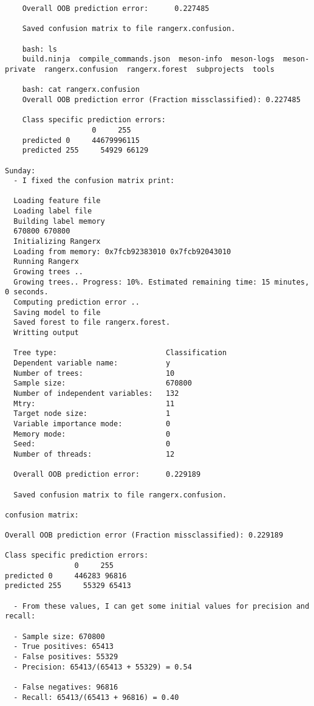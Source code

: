 \documentclass[12pt,oneside]{book}
\begin{document}
\begin{lstlisting}
    Overall OOB prediction error:      0.227485
    
    Saved confusion matrix to file rangerx.confusion.
    
    bash: ls
    build.ninja  compile_commands.json  meson-info  meson-logs  meson-private  rangerx.confusion  rangerx.forest  subprojects  tools
    
    bash: cat rangerx.confusion 
    Overall OOB prediction error (Fraction missclassified): 0.227485
    
    Class specific prediction errors:
                    0     255
    predicted 0     44679996115 
    predicted 255     54929 66129 

Sunday:
  - I fixed the confusion matrix print:

  Loading feature file
  Loading label file
  Building label memory
  670800 670800
  Initializing Rangerx
  Loading from memory: 0x7fcb92383010 0x7fcb92043010
  Running Rangerx
  Growing trees ..
  Growing trees.. Progress: 10%. Estimated remaining time: 15 minutes, 0 seconds.
  Computing prediction error ..
  Saving model to file
  Saved forest to file rangerx.forest.
  Writting output
  
  Tree type:                         Classification
  Dependent variable name:           y
  Number of trees:                   10
  Sample size:                       670800
  Number of independent variables:   132
  Mtry:                              11
  Target node size:                  1
  Variable importance mode:          0
  Memory mode:                       0
  Seed:                              0
  Number of threads:                 12
  
  Overall OOB prediction error:      0.229189
  
  Saved confusion matrix to file rangerx.confusion.

confusion matrix:

Overall OOB prediction error (Fraction missclassified): 0.229189

Class specific prediction errors:
                0     255
predicted 0     446283 96816 
predicted 255     55329 65413

  - From these values, I can get some initial values for precision and recall:

  - Sample size: 670800
  - True positives: 65413
  - False positives: 55329
  - Precision: 65413/(65413 + 55329) = 0.54

  - False negatives: 96816
  - Recall: 65413/(65413 + 96816) = 0.40


\end{lstlisting}
\end{document}
